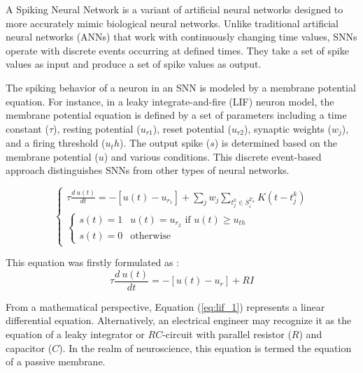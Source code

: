\documentclass[11pt]{article}
\begin{document}
A Spiking Neural Network is a variant of artificial neural networks designed to more accurately mimic biological neural networks. Unlike traditional artificial neural networks (ANNs) that work with continuously changing time values, SNNs operate with discrete events occurring at defined times. They take a set of spike values as input and produce a set of spike values as output.

The spiking behavior of a neuron in an SNN is modeled by a membrane potential equation. For instance, in a leaky integrate-and-fire (LIF) neuron model, the membrane potential equation is defined by a set of parameters including a time constant ($\tau$), resting potential ($u_{r1}$), reset potential ($u_{r2}$), synaptic weights ($w_j$), and a firing threshold ($u_th$). The output spike ($s$) is determined based on the membrane potential ($u$) and various conditions. This discrete event-based approach distinguishes SNNs from other types of neural networks.\cite{rething_comparison_ann_snn}

\begin{equation}
  \begin{cases}
    \tau \frac{d \: u(t)}{dt} = - [u(t) - u_{r_1}] + \sum_j w_j \sum_{t_j^k \in  S_i^{T_w}} K(t - t_j^k) \\
    \begin{cases}
      s(t) = 1 & u(t) = u_{r_2} \text{ if } u(t) \geq u_{th} \\
      s(t) = 0 & \text{otherwise}
    \end{cases}
  \end{cases}
  \label{eq:membrane_potential}
\end{equation}


This equation was firstly formulated as :
\begin{equation}
  \tau \frac{d \: u(t)}{dt} = - [u(t) - u_{r}] + RI
  \label{eq:lif_1}
\end{equation}

From a mathematical perspective, Equation (\ref{eq:lif_1}) represents a linear differential equation. Alternatively, an electrical engineer may recognize it as the equation of a leaky integrator or $RC$-circuit with parallel resistor ($R$) and capacitor ($C$). In the realm of neuroscience, this equation is termed the equation of a passive membrane. \cite{neuronal_dynamics}
\end{document}
